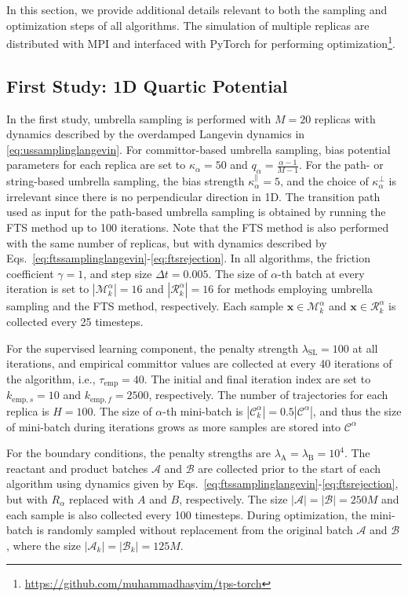 \documentclass{article}
\numberwithin{equation}{section}
\def\*#1{\mathbf{#1}}
\theoremstyle{definition}
\theoremstyle{remark}
\begin{document}
In this section, we provide additional details relevant to both the sampling and optimization steps of all algorithms. 
The simulation of multiple replicas are distributed with MPI and interfaced with PyTorch \cite{NEURIPS2019_9015} for performing optimization\footnote[2]{\url{  https://github.com/muhammadhasyim/tps-torch}}.

\subsection{First Study: 1D Quartic Potential}

In the first study, umbrella sampling is performed with $M=20$ replicas with dynamics described by the overdamped Langevin dynamics in \cref{eq:ussamplinglangevin}. 
For committor-based umbrella sampling, bias potential parameters for each replica are set to $\kappa_\alpha= 50$ and $q_\alpha = \frac{\alpha-1}{M-1}$. For the path- or string-based umbrella sampling, the bias strength $\kappa_\alpha^\parallel=5$, and the choice of  $\kappa_\alpha^\bot$ is irrelevant since there is no perpendicular direction in 1D. The transition path used as input for the path-based umbrella sampling is obtained by running the FTS method up to 100 iterations.
Note that the FTS method is also performed with the same number of replicas, but with dynamics described by Eqs.~\eqref{eq:ftssamplinglangevin}-\eqref{eq:ftsrejection}. 
In all algorithms, the friction coefficient $\gamma=1$, and step size $\Delta t = 0.005$. 
The size of $\alpha$-th batch at every iteration is set to $|\mathcal{M}_k^\alpha|=16$ and $|\mathcal{R}_k^\alpha|=16$ for methods employing umbrella sampling and the FTS method, respectively. 
Each sample $\* x \in \mathcal{M}_k^\alpha$ and $\* x \in \mathcal{R}_k^\alpha$ is collected every 25 timesteps.

For the supervised learning component, the penalty strength $\lambda_\mathrm{SL} = 100$ at all iterations, and empirical committor values are collected at every 40 iterations of the algorithm, i.e., $\tau_\mathrm{emp} = 40$. 
The initial and final iteration index are set to $k_{\mathrm{emp},s}=10$ and $k_{\mathrm{emp},f}=2500$, respectively. The number of trajectories for each replica is $H = 100$. The size of $\alpha$-th mini-batch is $|\mathcal{C}_k^\alpha| = 0.5 |\mathcal{C}^\alpha|$, and thus the size of mini-batch during iterations grows as more samples are stored into $\mathcal{C}^\alpha$

For the boundary conditions, the penalty strengths are $\lambda_\mathrm{A}=\lambda_\mathrm{B}=10^4$. 
The reactant and product batches $\mathcal{A}$ and $\mathcal{B}$ are collected prior to the start of each algorithm using dynamics given by Eqs.~\eqref{eq:ftssamplinglangevin}-\eqref{eq:ftsrejection}, but with $R_\alpha$ replaced with $A$ and $B$, respectively. 
The size $|\mathcal{A}|=|\mathcal{B}|=250M$ and each sample is also collected every 100 timesteps. 
During optimization, the mini-batch is randomly sampled without replacement from the original batch $\mathcal{A}$ and $\mathcal{B}$, where the size $|\mathcal{A}_k|=|\mathcal{B}_k|=125M$. 
\end{document}
